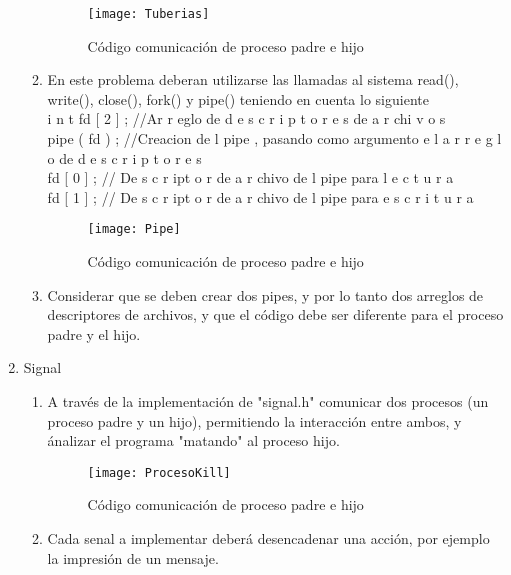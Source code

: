 \documentclass[a4paperx]{article}
\begin{document}
\begin{enumerate}
\begin{enumerate}
\begin{figure}[H]
\centering
\texttt{[image: Tuberias]}
\caption{C\'odigo comunicaci\'on de proceso padre e hijo}
\end{figure}

\item{En este problema deberan utilizarse las llamadas al sistema read(),
write(), close(), fork() y pipe() teniendo en cuenta lo siguiente\\

i n t fd [ 2 ] ; //Ar r eglo de d e s c r i p t o r e s de a r chi v o s\\
pipe ( fd ) ; //Creacion de l pipe , pasando como argumento e l
a r r e g l o de d e s c r i p t o r e s\\
fd [ 0 ] ; // De s c r ipt o r de a r chivo de l pipe para l e c t u r a\\
fd [ 1 ] ; // De s c r ipt o r de a r chivo de l pipe para e s c r i t u r a}\\

\begin{figure}[H]
\centering
\texttt{[image: Pipe]}
\caption{C\'odigo comunicaci\'on de proceso padre e hijo}
\end{figure}

\item{Considerar que se deben crear dos pipes, y por lo tanto dos arreglos
de descriptores de archivos, y que el c\'odigo debe ser diferente para
el proceso padre y el hijo.}\\

\end{enumerate}

\item{Signal}\\

\begin{enumerate}

\item{A trav\'es de la implementaci\'on de "signal.h" comunicar dos procesos
(un proceso padre y un hijo), permitiendo la interacci\'on entre ambos,
y \'analizar el programa "matando" al proceso hijo.}\\

\begin{figure}[H]
\centering
\texttt{[image: ProcesoKill]}
\caption{C\'odigo comunicaci\'on de proceso padre e hijo}
\end{figure}

\item{Cada senal a implementar deber\'a desencadenar una acci\'on, por ejemplo la impresi\'on de un mensaje.}\\


\end{enumerate}
\end{enumerate}
\end{document}
